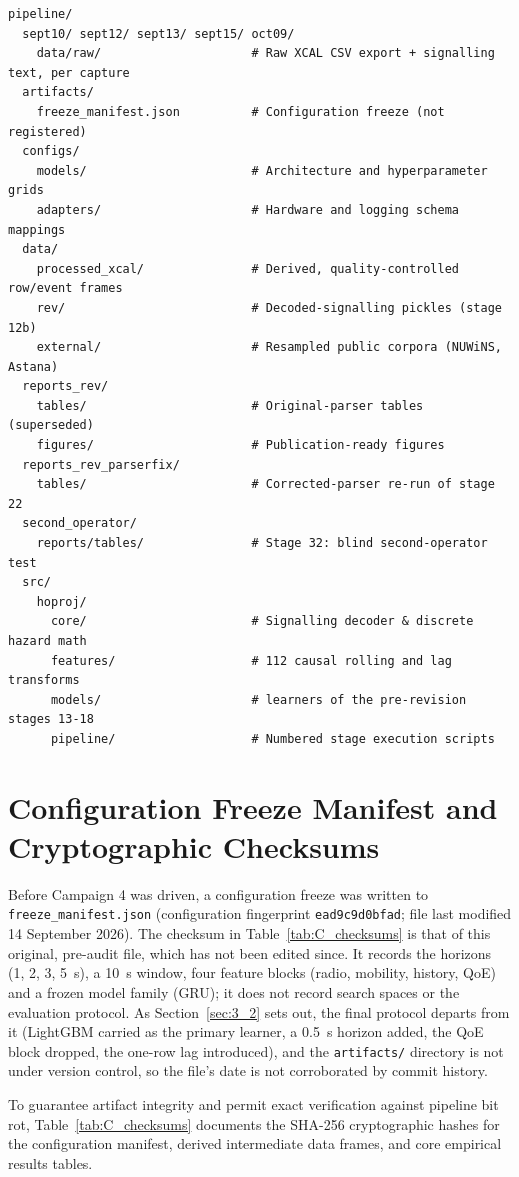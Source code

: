 \begin{verbatim}
pipeline/
  sept10/ sept12/ sept13/ sept15/ oct09/
    data/raw/                     # Raw XCAL CSV export + signalling text, per capture
  artifacts/
    freeze_manifest.json          # Configuration freeze (not registered)
  configs/
    models/                       # Architecture and hyperparameter grids
    adapters/                     # Hardware and logging schema mappings
  data/
    processed_xcal/               # Derived, quality-controlled row/event frames
    rev/                          # Decoded-signalling pickles (stage 12b)
    external/                     # Resampled public corpora (NUWiNS, Astana)
  reports_rev/
    tables/                       # Original-parser tables (superseded)
    figures/                      # Publication-ready figures
  reports_rev_parserfix/
    tables/                       # Corrected-parser re-run of stage 22
  second_operator/
    reports/tables/               # Stage 32: blind second-operator test
  src/
    hoproj/
      core/                       # Signalling decoder & discrete hazard math
      features/                   # 112 causal rolling and lag transforms
      models/                     # learners of the pre-revision stages 13-18
      pipeline/                   # Numbered stage execution scripts
\end{verbatim}

\section{Configuration Freeze Manifest and Cryptographic Checksums}
\label{sec:C_3}

Before Campaign 4 was driven, a configuration freeze was written to \texttt{freeze\_manifest.json} (configuration fingerprint \texttt{ead9c9d0bfad}; file last modified 14 September 2026). The checksum in Table~\ref{tab:C_checksums} is that of this original, pre-audit file, which has not been edited since. It records the horizons (1, 2, 3, 5~s), a 10~s window, four feature blocks (radio, mobility, history, QoE) and a frozen model family (GRU); it does not record search spaces or the evaluation protocol. As Section~\ref{sec:3_2} sets out, the final protocol departs from it (LightGBM carried as the primary learner, a 0.5~s horizon added, the QoE block dropped, the one-row lag introduced), and the \texttt{artifacts/} directory is not under version control, so the file's date is not corroborated by commit history.

To guarantee artifact integrity and permit exact verification against pipeline bit rot, Table~\ref{tab:C_checksums} documents the SHA-256 cryptographic hashes for the configuration manifest, derived intermediate data frames, and core empirical results tables.


